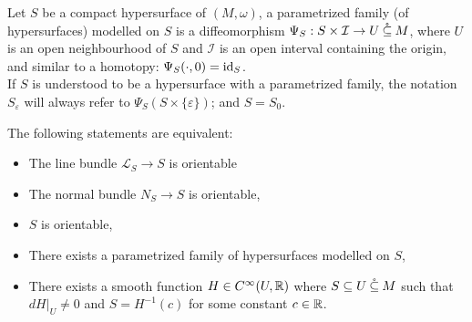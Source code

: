 \documentclass[../main-v2-manifolds.tex]{subfiles}
\begin{document}
\begin{definition}
    Let $S$ be a compact hypersurface of $(M,\omega)$, a parametrized family (of hypersurfaces) modelled on $S$ is a diffeomorphism $\Psi_S: S\times \mathcal{I}\to U\:\mathring{\subseteq}\: M$, where $U$ is an open neighbourhood of $S$ and $\mathcal{I}$ is an open interval containing the origin, and similar to a homotopy: $\Psi_S(\cdot,0) = \operatorname{id}_{S}$.\\

    If $S$ is understood to be a hypersurface with a parametrized family, the notation $S_{\varepsilon}$ will always refer to  $\Psi_S(S\times\{\varepsilon\})$; and $S = S_0$.
\end{definition}
\begin{wts}[page 114]
    The following statements are equivalent:
    \begin{itemize}
        \item The line bundle $\mathcal{L}_S\to S$ is orientable
        \item The normal bundle $N_S\to S$ is orientable,
        \item $S$ is orientable,
        \item There exists a parametrized family of hypersurfaces modelled on $S$,
        \item There exists a smooth function $H\in C^\infty(U,\mathbb{R})$ where $S\subseteq U\:\mathring{\subseteq}\: M$ such that $dH\vert_U\neq 0$ and $S = H^{-1}(c)$ for some constant $c\in\mathbb{R}$.
    \end{itemize}
\end{wts}   
\end{document}
